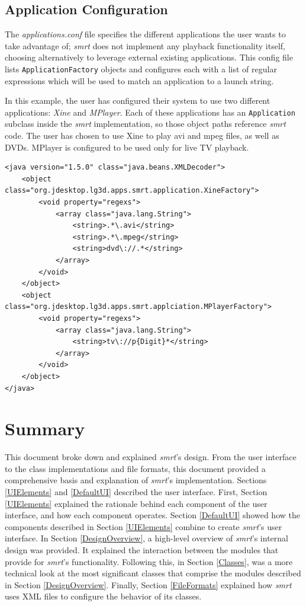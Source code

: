 \documentclass[letterpaper, titlepage, 11pt]{article}
\begin{document}
\subsection{Application Configuration}
\label{AppConfig}
The \textit{applications.conf} file specifies the different applications the
user wants to take advantage of; \textit{smrt} does not implement any playback
functionality itself, choosing alternatively to leverage external existing
applications.  This config file lists \texttt{ApplicationFactory} objects and
configures each with a list of regular expressions which will be used to match
an application to a launch string.

In this example, the user has configured their system to use two different
applications: \textit{Xine} and \textit{MPlayer}.  Each of these applications
has an \texttt{Application} subclass inside the \textit{smrt} implementation, so
those object paths reference \textit{smrt} code.  The user has chosen to use
Xine to play avi and mpeg files, as well as DVDs.  MPlayer is configured to be
used only for live TV playback.

\begin{verbatim}
<java version="1.5.0" class="java.beans.XMLDecoder">
    <object class="org.jdesktop.lg3d.apps.smrt.application.XineFactory">
        <void property="regexs">
            <array class="java.lang.String">
                <string>.*\.avi</string>
                <string>.*\.mpeg</string>
                <string>dvd\://.*</string>
            </array>
        </void>
    </object>
    <object class="org.jdesktop.lg3d.apps.smrt.applciation.MPlayerFactory">
        <void property="regexs">
            <array class="java.lang.String">
                <string>tv\://p{Digit}*</string>
            </array>
        </void>
    </object>
</java>
\end{verbatim}

\section{Summary}
This document broke down and explained \textit{smrt}'s design. From the user
interface to the class implementations and file formats, this document provided
a comprehensive basis and explanation of \textit{smrt}'s implementation.
Sections \ref{UIElements} and \ref{DefaultUI} described the user interface.
First, Section \ref{UIElements} explained the rationale behind each component of
the user interface, and how each component operates. Section \ref{DefaultUI}
showed how the components described in Section \ref{UIElements} combine to
create \textit{smrt}'s user interface.  In Section \ref{DesignOverview}, a
high-level overview of \textit{smrt}'s internal design was provided. It
explained the interaction between the modules that provide for \textit{smrt}'s
functionality. Following this, in Section \ref{Classes}, was a more technical
look at the most significant classes that comprise the modules described in
Section \ref{DesignOverview}.  Finally, Section \ref{FileFormats} explained how
\textit{smrt} uses XML files to configure the behavior of its classes.
\end{document}

